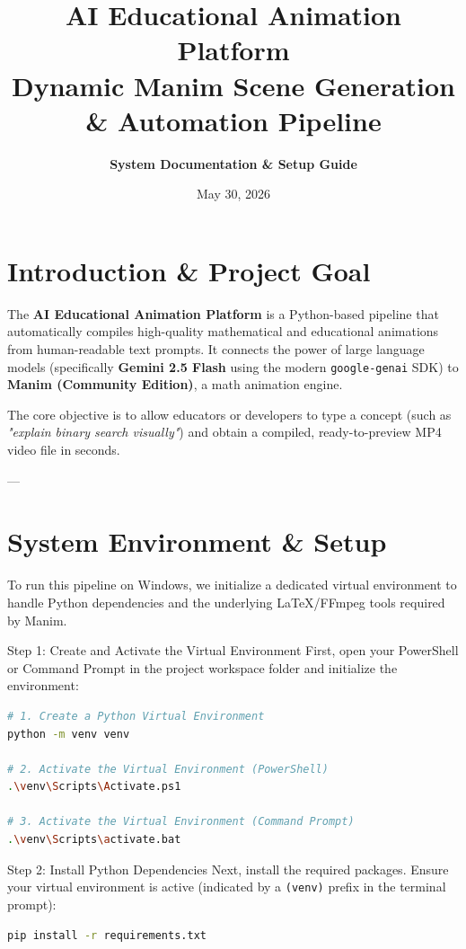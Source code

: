 \documentclass[11pt,a4paper]{article}
\title{\Huge \textbf{AI Educational Animation Platform} \\ \Large Dynamic Manim Scene Generation \& Automation Pipeline}
\author{\textbf{System Documentation \& Setup Guide}}
\date{May 30, 2026}
\begin{document}
\maketitle
\tableofcontents
\newpage

\section{Introduction \& Project Goal}
The \textbf{AI Educational Animation Platform} is a Python-based pipeline that automatically compiles high-quality mathematical and educational animations from human-readable text prompts. It connects the power of large language models (specifically \textbf{Gemini 2.5 Flash} using the modern \texttt{google-genai} SDK) to \textbf{Manim (Community Edition)}, a math animation engine.

The core objective is to allow educators or developers to type a concept (such as \textit{"explain binary search visually"}) and obtain a compiled, ready-to-preview MP4 video file in seconds.

---

\section{System Environment \& Setup}
To run this pipeline on Windows, we initialize a dedicated virtual environment to handle Python dependencies and the underlying LaTeX/FFmpeg tools required by Manim.

\begin{setupbox}{Step 1: Create and Activate the Virtual Environment}
First, open your PowerShell or Command Prompt in the project workspace folder and initialize the environment:
\begin{lstlisting}[language=bash]
# 1. Create a Python Virtual Environment
python -m venv venv

# 2. Activate the Virtual Environment (PowerShell)
.\venv\Scripts\Activate.ps1

# 3. Activate the Virtual Environment (Command Prompt)
.\venv\Scripts\activate.bat
\end{lstlisting}
\end{setupbox}

\begin{setupbox}{Step 2: Install Python Dependencies}
Next, install the required packages. Ensure your virtual environment is active (indicated by a \texttt{(venv)} prefix in the terminal prompt):
\begin{lstlisting}[language=bash]
pip install -r requirements.txt
\end{lstlisting}
\end{setupbox}
\end{document}

